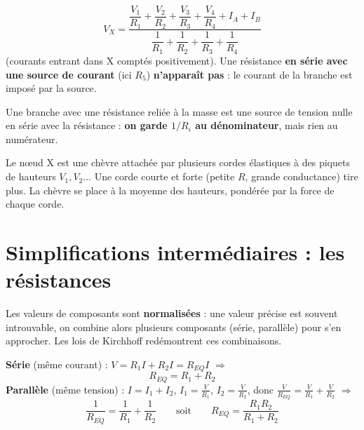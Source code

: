 
\begin{propbox}[title=Millman avec des sources de courant]
\[ V_X = \frac{\dfrac{V_1}{R_1} + \dfrac{V_2}{R_2} + \dfrac{V_3}{R_3} + \dfrac{V_4}{R_4} + I_A + I_B}
              {\dfrac1{R_1} + \dfrac1{R_2} + \dfrac1{R_3} + \dfrac1{R_4}} \]
(courants entrant dans X comptés positivement). Une résistance \textbf{en série avec une
source de courant} (ici $R_5$) \textbf{n'apparaît pas} : le courant de la branche est imposé
par la source.
\end{propbox}

\begin{warnbox}[title={Cas particulier : $V_i = 0$}]
Une branche avec une résistance reliée à la masse est une source de tension nulle en série
avec la résistance : \textbf{on garde $1/R_i$ au dénominateur}, mais rien au numérateur.
\end{warnbox}

\begin{goatbox}
Le n\oe ud X est une chèvre attachée par plusieurs cordes élastiques à des piquets de
hauteurs $V_1, V_2\ldots$ Une corde courte et forte (petite $R$, grande conductance) tire
plus. La chèvre se place à la moyenne des hauteurs, pondérée par la force de chaque corde.
\end{goatbox}

\section{Simplifications intermédiaires : les résistances}

Les valeurs de composants sont \textbf{normalisées} : une valeur précise est souvent
introuvable, on combine alors plusieurs composants (série, parallèle) pour s'en approcher.
Les lois de Kirchhoff redémontrent ces combinaisons.


\begin{thmbox}[title=Résistances en série et en parallèle]
\textbf{Série} (même courant) : $V = R_1 I + R_2 I = R_{EQ} I$ $\Rightarrow$
\[ R_{EQ} = R_1 + R_2 \]
\textbf{Parallèle} (même tension) : $I = I_1 + I_2$, $I_1 = \frac{V}{R_1}$, $I_2 = \frac{V}{R_2}$,
donc $\frac{V}{R_{EQ}} = \frac{V}{R_1} + \frac{V}{R_2}$ $\Rightarrow$
\[ \frac1{R_{EQ}} = \frac1{R_1} + \frac1{R_2} \qquad\text{soit}\qquad
   R_{EQ} = \frac{R_1 R_2}{R_1 + R_2} \]
\end{thmbox}

